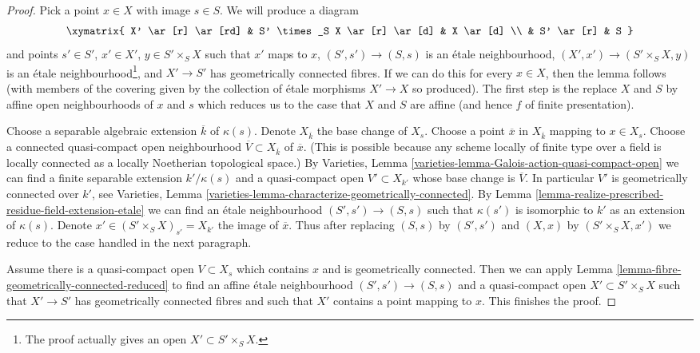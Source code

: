 \begin{proof}
Pick a point $x \in X$ with image $s \in S$. We will produce
a diagram
$$
\xymatrix{
X' \ar[r] \ar[rd] & S' \times_S X \ar[r] \ar[d] & X \ar[d] \\
& S' \ar[r] & S
}
$$
and points $s' \in S'$, $x' \in X'$, $y \in S' \times_S X$
such that $x'$ maps to $x$, $(S', s') \to (S, s)$
is an \'etale neighbourhood, $(X', x') \to (S' \times_S X, y)$
is an \'etale neighbourhood\footnote{The proof actually gives
an open $X' \subset S' \times_S X$.}, and
$X' \to S'$ has geometrically
connected fibres. If we can do this for every $x \in X$, then
the lemma follows (with members of the covering given by the
collection of \'etale morphisms $X' \to X$ so produced).
The first step is the replace $X$ and $S$ by affine open neighbourhoods
of $x$ and $s$ which reduces us to the case that $X$ and $S$ are affine
(and hence $f$ of finite presentation).

\medskip\noindent
Choose a separable algebraic extension $\overline{k}$ of $\kappa(s)$.
Denote $X_{\overline{k}}$ the base change of $X_s$.
Choose a point $\overline{x}$ in $X_{\overline{k}}$ mapping to $x \in X_s$.
Choose a connected quasi-compact open neighbourhood
$\overline{V} \subset X_{\overline{k}}$
of $\overline{x}$. (This is possible because any scheme
locally of finite type over a field is locally connected
as a locally Noetherian topological space.)
By Varieties, Lemma \ref{varieties-lemma-Galois-action-quasi-compact-open}
we can find a finite separable extension $k'/\kappa(s)$
and a quasi-compact open $V' \subset X_{k'}$ whose
base change is $\overline{V}$. In particular $V'$ is
geometrically connected over $k'$, see
Varieties, Lemma \ref{varieties-lemma-characterize-geometrically-connected}. By
Lemma \ref{lemma-realize-prescribed-residue-field-extension-etale}
we can find an \'etale neighbourhood $(S', s') \to (S, s)$
such that $\kappa(s')$ is isomorphic to $k'$ as an extension
of $\kappa(s)$.
Denote $x' \in (S' \times_S X)_{s'} = X_{k'}$ the image of $\overline{x}$.
Thus after replacing $(S, s)$ by $(S', s')$ and $(X, x)$ by
$(S' \times_S X, x')$ we reduce to the case handled in the next
paragraph.

\medskip\noindent
Assume there is a quasi-compact open $V \subset X_s$
which contains $x$ and is geometrically connected.
Then we can apply Lemma \ref{lemma-fibre-geometrically-connected-reduced}
to find an affine \'etale neighbourhood $(S', s') \to (S, s)$
and a quasi-compact open $X' \subset S' \times_S X$ such that
$X' \to S'$ has geometrically connected fibres
and such that $X'$ contains a point mapping to $x$.
This finishes the proof.
\end{proof}

